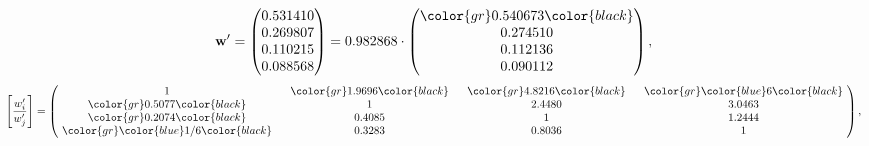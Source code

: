 \begin{example}
\begin{equation*}
\mathbf{w}^{\prime} =
\begin{pmatrix}
0.531410\\
0.269807\\
0.110215\\
0.088568
\end{pmatrix} =
0.982868\cdot
\begin{pmatrix}
\color{gr} 0.540673\color{black} \\
0.274510\\
0.112136\\
0.090112
\end{pmatrix},
\end{equation*}
\begin{equation*}
\left[ \frac{{w}^{\prime}_i}{{w}^{\prime}_j} \right] =
\begin{pmatrix}
$\,\,$ 1 $\,\,$ & $\,\,$\color{gr} 1.9696\color{black} $\,\,$ & $\,\,$\color{gr} 4.8216\color{black} $\,\,$ & $\,\,$\color{gr} \color{blue} 6\color{black} $\,\,$ \\
$\,\,$\color{gr} 0.5077\color{black} $\,\,$ & $\,\,$ 1 $\,\,$ & $\,\,$2.4480$\,\,$ & $\,\,$3.0463  $\,\,$ \\
$\,\,$\color{gr} 0.2074\color{black} $\,\,$ & $\,\,$0.4085$\,\,$ & $\,\,$ 1 $\,\,$ & $\,\,$1.2444 $\,\,$ \\
$\,\,$\color{gr} \color{blue}  1/6\color{black} $\,\,$ & $\,\,$0.3283$\,\,$ & $\,\,$0.8036$\,\,$ & $\,\,$ 1  $\,\,$ \\
\end{pmatrix},
\end{equation*}
\end{example}
\newpage
